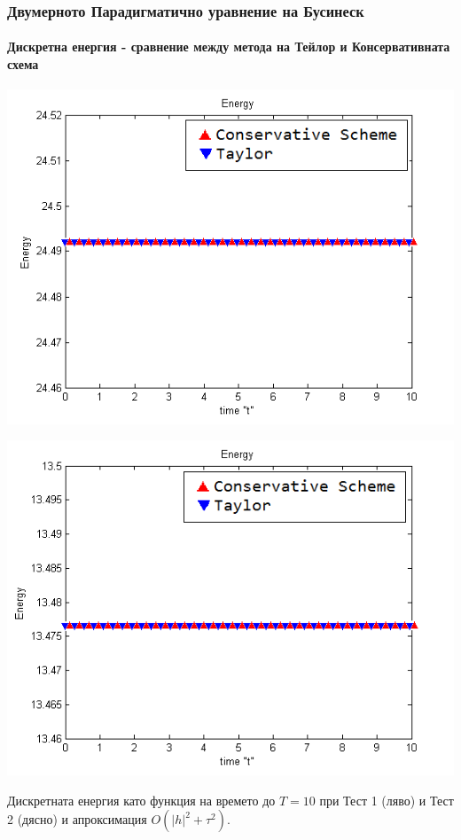 \documentclass{beamer}
\begin{document}
\begin{frame}
\frametitle{Двумерното Парадигматично уравнение на Бусинеск}
\framesubtitle{Дискретна енергия - сравнение между метода на Тейлор и Консервативната схема}

\begin{center}\vspace{0.4cm}
	\begin{minipage}[b]{0.49\linewidth}
		\includegraphics[width=\linewidth]{Energy_bt3_c045_h005.png}
	\end{minipage}	
	\begin{minipage}[b]{0.49\linewidth}
		\includegraphics[width=\linewidth]{Energy_bt1_c090_h010.png}
		
	\end{minipage}
\end{center}
Дискретната енергия като функция на времето до $T = 10$ при Тест 1 (ляво) и Тест 2 (дясно) и апроксимация $O(|h|^2 + \tau^2)$.
\end{frame}
\end{document}
